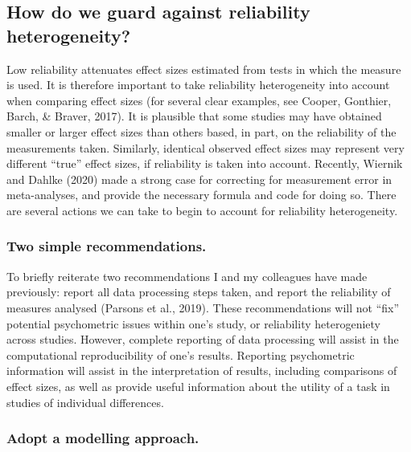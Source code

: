 \documentclass[english,man,floatsintext]{apa6}
\begin{document}
\hypertarget{how-do-we-guard-against-reliability-heterogeneity}{%
\subsection{How do we guard against reliability heterogeneity?}\label{how-do-we-guard-against-reliability-heterogeneity}}

Low reliability attenuates effect sizes estimated from tests in which the measure is used. It is therefore important to take reliability heterogeneity into account when comparing effect sizes (for several clear examples, see Cooper, Gonthier, Barch, \& Braver, 2017). It is plausible that some studies may have obtained smaller or larger effect sizes than others based, in part, on the reliability of the measurements taken. Similarly, identical observed effect sizes may represent very different \enquote{true} effect sizes, if reliability is taken into account. Recently, Wiernik and Dahlke (2020) made a strong case for correcting for measurement error in meta-analyses, and provide the necessary formula and code for doing so. There are several actions we can take to begin to account for reliability heterogeneity.

\hypertarget{two-simple-recommendations.}{%
\subsubsection{Two simple recommendations.}\label{two-simple-recommendations.}}

To briefly reiterate two recommendations I and my colleagues have made previously: report all data processing steps taken, and report the reliability of measures analysed (Parsons et al., 2019). These recommendations will not \enquote{fix} potential psychometric issues within one's study, or reliability heterogeniety across studies. However, complete reporting of data processing will assist in the computational reproducibility of one's results. Reporting psychometric information will assist in the interpretation of results, including comparisons of effect sizes, as well as provide useful information about the utility of a task in studies of individual differences.

\hypertarget{adopt-a-modelling-approach.}{%
\subsubsection{Adopt a modelling approach.}\label{adopt-a-modelling-approach.}}
\end{document}
